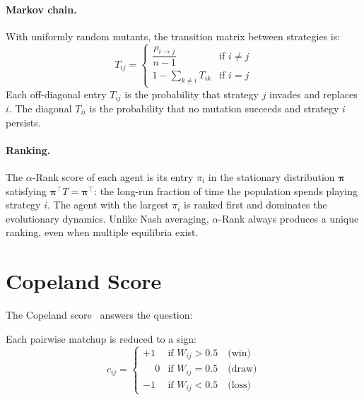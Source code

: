 \paragraph*{Markov chain.} With uniformly random mutants, the transition matrix between strategies is:
\begin{equation}
    T_{ij} =
    \begin{cases}
        \dfrac{\rho_{i \to j}}{n - 1} & \text{if } i \neq j \\[6pt]
        1 - \displaystyle\sum_{k \neq i} T_{ik} & \text{if } i = j
    \end{cases}
\end{equation}
Each off-diagonal entry $T_{ij}$ is the probability that strategy $j$ invades and replaces $i$. The diagonal $T_{ii}$ is the probability that no mutation succeeds and strategy $i$ persists.

\paragraph*{Ranking.} The $\alpha$-Rank score of each agent is its entry $\pi_i$ in the stationary distribution $\boldsymbol{\pi}$ satisfying $\boldsymbol{\pi}^\top T = \boldsymbol{\pi}^\top$: the long-run fraction of time the population spends playing strategy $i$. The agent with the largest $\pi_i$ is ranked first and dominates the evolutionary dynamics. Unlike Nash averaging, $\alpha$-Rank always produces a unique ranking, even when multiple equilibria exist.

\section{Copeland Score}
\label{app:copeland-impl}

The Copeland score~\cite{saariCopelandMethodRelationships1996} answers the question: 

\medskip

Each pairwise matchup is reduced to a sign:
\begin{equation}
    c_{ij} =
    \begin{cases}
        +1 & \text{if } W_{ij} > 0.5 \quad \text{(win)} \\
        \phantom{+}0 & \text{if } W_{ij} = 0.5 \quad \text{(draw)} \\
        -1 & \text{if } W_{ij} < 0.5 \quad \text{(loss)}
    \end{cases}
\end{equation}

